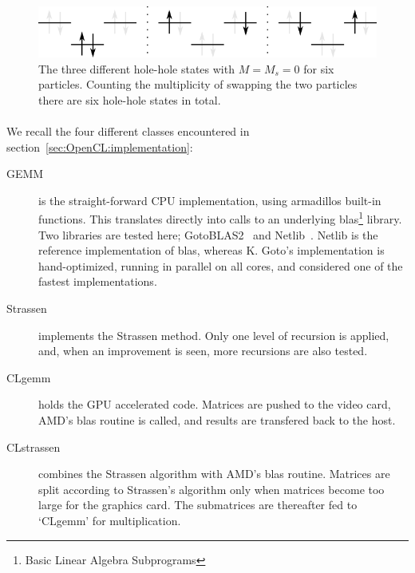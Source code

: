 \begin{figure}
\begin{center}
\includegraphics[scale=1.5]{../10-results/figs/hhStatesF2.png}
\caption{The three different hole-hole states with $M = M_s = 0$ for six particles. Counting the multiplicity of swapping the two particles there are six hole-hole states in total.}
\label{fig:results:hhStatesF2}
\end{center}
\end{figure}

\paragraph{}
We recall the four different classes encountered in section~\ref{sec:OpenCL:implementation}:
\begin{description}
\item[GEMM] is the straight-forward CPU implementation, using armadillos built-in functions. This translates directly into calls to an underlying blas\footnote{Basic Linear Algebra Subprograms} library. Two libraries are tested here; GotoBLAS2~\cite{Goto:2008:HIL:1377603.1377607} and Netlib~\cite{netlibblas}.
Netlib is the reference implementation of blas, whereas K. Goto's implementation is hand-optimized, running in parallel on all cores, and considered one of the fastest implementations.
\item[Strassen] implements the Strassen method. Only one level of recursion is applied, and, when an improvement is seen, more recursions are also tested.
\item[CLgemm] holds the GPU accelerated code. Matrices are pushed to the video card, AMD's blas routine is called, and results are transfered back to the host. 
\item[CLstrassen] combines the Strassen algorithm with AMD's blas routine. Matrices are split according to Strassen's algorithm only when matrices become too large for the graphics card. The submatrices are thereafter fed to `CLgemm' for multiplication.
\end{description}


